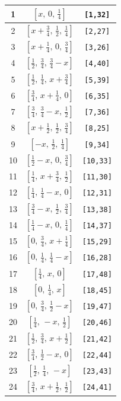 \documentclass[fleqn,8pt]{jsarticle}
\begin{document}
\begin{longtable}{ccc}
1 & $\left[ x,\, 0,\, \frac{1}{4} \right]$ & {\tt [1,32]} \\ \hline
2 & $\left[ x + \frac{3}{4},\, \frac{1}{2},\, \frac{1}{4} \right]$ & {\tt [2,27]} \\ \hline
3 & $\left[ x + \frac{1}{4},\, 0,\, \frac{3}{4} \right]$ & {\tt [3,26]} \\ \hline
4 & $\left[ \frac{1}{2},\, \frac{3}{4},\, \frac{3}{4} - x \right]$ & {\tt [4,40]} \\ \hline
5 & $\left[ \frac{1}{2},\, \frac{1}{4},\, x + \frac{3}{4} \right]$ & {\tt [5,39]} \\ \hline
6 & $\left[ \frac{3}{4},\, x + \frac{1}{4},\, 0 \right]$ & {\tt [6,35]} \\ \hline
7 & $\left[ \frac{3}{4},\, \frac{3}{4} - x,\, \frac{1}{2} \right]$ & {\tt [7,36]} \\ \hline
8 & $\left[ x + \frac{1}{2},\, \frac{1}{2},\, \frac{3}{4} \right]$ & {\tt [8,25]} \\ \hline
9 & $\left[ - x,\, \frac{1}{2},\, \frac{1}{4} \right]$ & {\tt [9,34]} \\ \hline
10 & $\left[ \frac{1}{2} - x,\, 0,\, \frac{3}{4} \right]$ & {\tt [10,33]} \\ \hline
11 & $\left[ \frac{1}{4},\, x + \frac{3}{4},\, \frac{1}{2} \right]$ & {\tt [11,30]} \\ \hline
12 & $\left[ \frac{1}{4},\, \frac{1}{4} - x,\, 0 \right]$ & {\tt [12,31]} \\ \hline
13 & $\left[ \frac{3}{4} - x,\, \frac{1}{2},\, \frac{3}{4} \right]$ & {\tt [13,38]} \\ \hline
14 & $\left[ \frac{1}{4} - x,\, 0,\, \frac{1}{4} \right]$ & {\tt [14,37]} \\ \hline
15 & $\left[ 0,\, \frac{3}{4},\, x + \frac{1}{4} \right]$ & {\tt [15,29]} \\ \hline
16 & $\left[ 0,\, \frac{1}{4},\, \frac{1}{4} - x \right]$ & {\tt [16,28]} \\ \hline
17 & $\left[ \frac{1}{4},\, x,\, 0 \right]$ & {\tt [17,48]} \\ \hline
18 & $\left[ 0,\, \frac{1}{4},\, x \right]$ & {\tt [18,45]} \\ \hline
19 & $\left[ 0,\, \frac{3}{4},\, \frac{1}{2} - x \right]$ & {\tt [19,47]} \\ \hline
20 & $\left[ \frac{1}{4},\, - x,\, \frac{1}{2} \right]$ & {\tt [20,46]} \\ \hline
21 & $\left[ \frac{1}{2},\, \frac{3}{4},\, x + \frac{1}{2} \right]$ & {\tt [21,42]} \\ \hline
22 & $\left[ \frac{3}{4},\, \frac{1}{2} - x,\, 0 \right]$ & {\tt [22,44]} \\ \hline
23 & $\left[ \frac{1}{2},\, \frac{1}{4},\, - x \right]$ & {\tt [23,43]} \\ \hline
24 & $\left[ \frac{3}{4},\, x + \frac{1}{2},\, \frac{1}{2} \right]$ & {\tt [24,41]} \\
\end{longtable}
\end{document}
